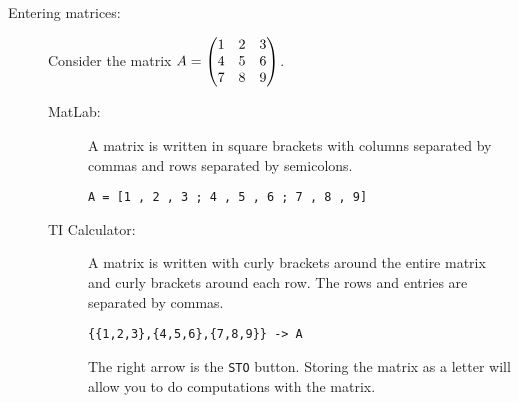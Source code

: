 \begin{description}
    \item[Entering matrices:]  Consider the matrix $A = \begin{pmatrix} 1 & 2 & 3 \\ 4 & 5 & 6 \\ 7 &
        8 & 9 \end{pmatrix}$.
        \begin{description}
            \item[MatLab:] A matrix is written in square brackets with columns separated
                by commas and rows separated by semicolons.
\begin{verbatim}
A = [1 , 2 , 3 ; 4 , 5 , 6 ; 7 , 8 , 9]
\end{verbatim}
            \item[TI Calculator:] A matrix is written with curly brackets around the
                entire matrix and curly brackets around each row.  The rows and entries
                are separated by commas.
\begin{verbatim}
{{1,2,3},{4,5,6},{7,8,9}} -> A
\end{verbatim}
                The right arrow is the \texttt{STO} button.  Storing the matrix as a
                letter will allow you to do computations with the matrix.
        \end{description}


\end{description}
